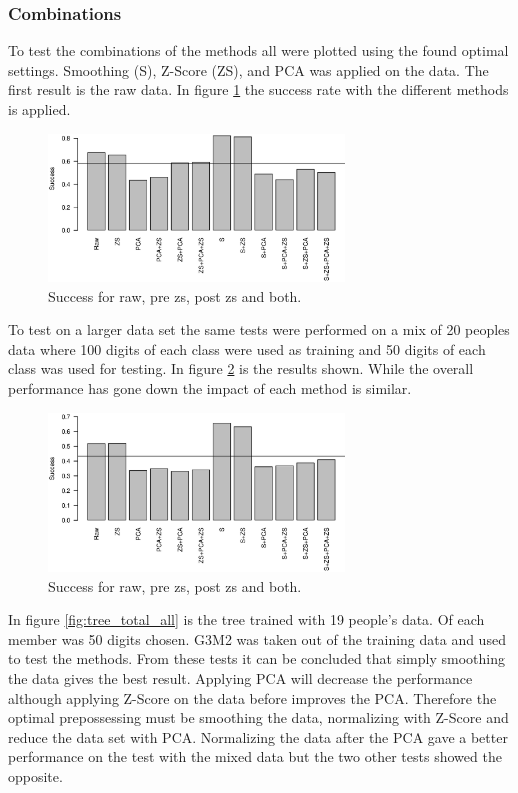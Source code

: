 \subsubsection{Combinations}

To test the combinations of the methods all were plotted using the found optimal settings.
Smoothing (S), Z-Score (ZS), and PCA was applied on the data.
The first result is the raw data.
In figure \ref{fig:tree_total} the success rate with the different methods is applied.

\begin{figure}[H]
\centering
\includegraphics[width=0.7\textwidth]{graphics/tree_total}
\caption{Success for raw, pre zs, post zs and both.}
\label{fig:tree_total}
\end{figure}

To test on a larger data set the same tests were performed on a mix of 20 peoples data where 100 digits of each class were used as training and 50 digits of each class was used for testing.
In figure \ref{fig:tree_total_mixed} is the results shown.
While the overall performance has gone down the impact of each method is similar.

\begin{figure}[H]
\centering
\includegraphics[width=0.7\textwidth]{graphics/tree_total_mixed}
\caption{Success for raw, pre zs, post zs and both.}
\label{fig:tree_total_mixed}
\end{figure}

In figure \ref{fig:tree_total_all} is the tree trained with 19 people's data. 
Of each member was 50 digits chosen.
G3M2 was taken out of the training data and used to test the methods.
From these tests it can be concluded that simply smoothing the data gives the best result.
Applying PCA will decrease the performance although applying Z-Score on the data before improves the PCA.
Therefore the optimal prepossessing must be smoothing the data, normalizing with Z-Score and reduce the data set with PCA.
Normalizing the data after the PCA gave a better performance on the test with the mixed data but the two other tests showed the opposite.

